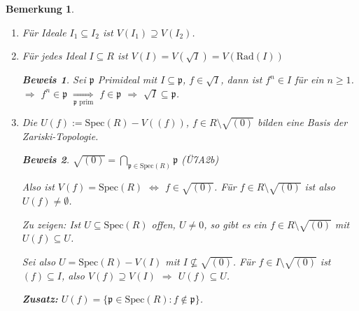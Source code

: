 \documentclass[a4paper,12pt]{scrbook}
\theoremstyle{break}
\newtheorem{Bem}[Def]{Bemerkung}
\theoremstyle{nonumberbreak}
\newtheorem{Bew}{Beweis}
\theoremstyle{nonumberplain}
\begin{document}
\begin{Bem}

\begin{enumerate}
\item[a)] Für Ideale $I_1 \subseteq I_2$ ist $V(I_1) \supseteq V(I_2)$.

\item[b)] Für jedes Ideal $I \subseteq R$ ist $V(I) = V(\sqrt{I}) = V(\textrm{Rad}(I))$

\begin{Bew}
Sei $\mathfrak{p}$ Primideal mit $I \subseteq \mathfrak{p}$, $f \in \sqrt{I}$, dann ist $f^n \in I$ für ein $n \geq 1$. $\Rightarrow$ $f^n \in \mathfrak{p}$ $\underset{\mathfrak{p} \text{ prim}}\Rightarrow$ $f \in \mathfrak{p}$ $\Rightarrow$ $\sqrt{I} \subseteq \mathfrak{p}$.
\end{Bew}

\item[c)]
Die $U(f) := \textrm{Spec}(R) - V( (f) )$, $f \in R \setminus \sqrt{(0)}$ bilden eine Basis der Zariski-Topologie.

\begin{Bew}
$\sqrt{(0)} = \bigcap_{\mathfrak{p} \in \textrm{Spec}(R)}{\mathfrak{p}}$ (Ü7A2b)

Also ist $V(f) = \textrm{Spec}(R)$ $\Leftrightarrow$ $f \in \sqrt{(0)}$. Für $f \in R \setminus \sqrt{(0)}$ ist also $U(f) \neq \emptyset$.

Zu zeigen: Ist $U \subseteq \textrm{Spec}(R)$ offen, $U \neq 0$, so gibt es ein $f \in R \setminus \sqrt{(0)}$ mit $U(f) \subseteq U$.

Sei also $U = \textrm{Spec}(R) - V(I)$ mit $I \nsubseteq \sqrt{(0)}$. Für $f \in I \setminus \sqrt{(0)}$ ist $(f) \subseteq I$, also $V(f) \supseteq V(I)$ $\Rightarrow$ $U(f) \subseteq U$.

\textbf{Zusatz:} $U(f) = \{ \mathfrak{p} \in \textrm{Spec}(R) : f \notin \mathfrak{p} \}$.

\end{Bew}

\end{enumerate}

\end{Bem}
\end{document}
